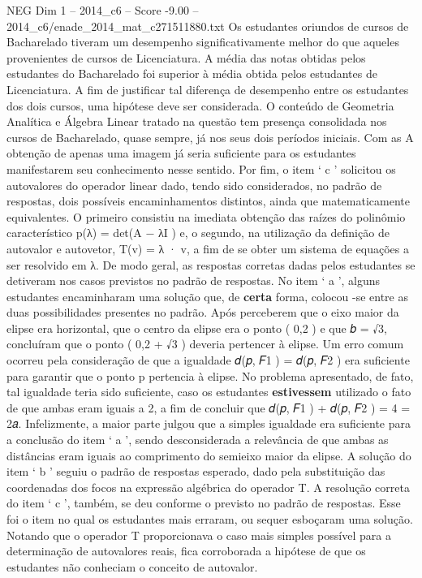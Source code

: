 \begin{textsample}{NEG Dim 1 – 2014\_c6 – Score -9.00 – 2014\_c6/enade\_2014\_mat\_c271511880.txt}
Os estudantes oriundos de cursos de Bacharelado tiveram um desempenho significativamente melhor do que aqueles provenientes de cursos de Licenciatura.
A média das notas obtidas pelos estudantes do Bacharelado foi superior à média obtida pelos estudantes de Licenciatura.
A fim de justificar tal diferença de desempenho entre os estudantes dos dois cursos, uma hipótese deve ser considerada.
O conteúdo de Geometria Analítica e Álgebra Linear tratado na questão tem presença consolidada nos cursos de Bacharelado, quase sempre, já nos seus dois períodos iniciais.
Com as A obtenção de apenas uma imagem já seria suficiente para os estudantes manifestarem seu conhecimento nesse sentido.
Por fim, o item ‘ c ’ solicitou os autovalores do operador linear dado, tendo sido considerados, no padrão de respostas, dois possíveis encaminhamentos distintos, ainda que matematicamente equivalentes.
O primeiro consistiu na imediata obtenção das raízes do polinômio característico p(λ) = det(A − λI ) e, o segundo, na utilização da definição de autovalor e autovetor, T(v) = λ · v, a fim de se obter um sistema de equações a ser resolvido em λ.
De modo geral, as respostas corretas dadas pelos estudantes se detiveram nos casos previstos no padrão de respostas.
No item ‘ a ’, alguns estudantes encaminharam uma solução que, de \textbf{certa} forma, colocou -se entre as duas possibilidades presentes no padrão.
Após perceberem que o eixo maior da elipse era horizontal, que o centro da elipse era o ponto ( 0,2 ) e que 𝑏 = √3, concluíram que o ponto ( 0,2 + √3 ) deveria pertencer à elipse.
Um erro comum ocorreu pela consideração de que a igualdade 𝑑(𝑝, 𝐹1 ) = 𝑑(𝑝, 𝐹2 ) era suficiente para garantir que o ponto p pertencia à elipse.
No problema apresentado, de fato, tal igualdade teria sido suficiente, caso os estudantes \textbf{estivessem} utilizado o fato de que ambas eram iguais a 2, a fim de concluir que 𝑑(𝑝, 𝐹1 ) + 𝑑(𝑝, 𝐹2 ) = 4 = 2𝑎.
Infelizmente, a maior parte julgou que a simples igualdade era suficiente para a conclusão do item ‘ a ’, sendo desconsiderada a relevância de que ambas as distâncias eram iguais ao comprimento do semieixo maior da elipse.
A solução do item ‘ b ’ seguiu o padrão de respostas esperado, dado pela substituição das coordenadas dos focos na expressão algébrica do operador T.
A resolução correta do item ‘ c ’, também, se deu conforme o previsto no padrão de respostas.
Esse foi o item no qual os estudantes mais erraram, ou sequer esboçaram uma solução.
Notando que o operador T proporcionava o caso mais simples possível para a determinação de autovalores reais, fica corroborada a hipótese de que os estudantes não conheciam o conceito de autovalor.

\end{textsample}
